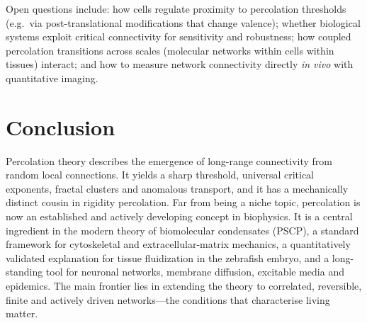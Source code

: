 \documentclass[11pt]{article}
\begin{document}
Open questions include: how cells regulate proximity to percolation thresholds (e.g.\ via post-translational modifications that change valence); whether biological systems exploit critical connectivity for sensitivity and robustness; how coupled percolation transitions across scales (molecular networks within cells within tissues) interact; and how to measure network connectivity directly \emph{in vivo} with quantitative imaging.

\section{Conclusion}

Percolation theory describes the emergence of long-range connectivity from random local connections. It yields a sharp threshold, universal critical exponents, fractal clusters and anomalous transport, and it has a mechanically distinct cousin in rigidity percolation. Far from being a niche topic, percolation is now an established and actively developing concept in biophysics. It is a central ingredient in the modern theory of biomolecular condensates (PSCP), a standard framework for cytoskeletal and extracellular-matrix mechanics, a quantitatively validated explanation for tissue fluidization in the zebrafish embryo, and a long-standing tool for neuronal networks, membrane diffusion, excitable media and epidemics. The main frontier lies in extending the theory to correlated, reversible, finite and actively driven networks---the conditions that characterise living matter.
\end{document}
